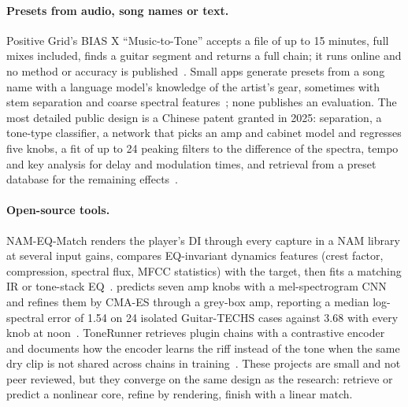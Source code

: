 \paragraph{Presets from audio, song names or text.} Positive Grid's BIAS X
``Music-to-Tone'' accepts a file of up to 15 minutes, full mixes included, finds a
guitar segment and returns a full chain; it runs online and no method or accuracy
is published~\cite{positivegridndbiasxhelp,positivegrid2025biasxai}. Small apps
generate presets from a song name with a language model's knowledge of the
artist's gear, sometimes with stem separation and coarse spectral
features~\cite{bouharb2026gptonebuilder,aitonetechndgenerator}; none publishes an
evaluation. The most detailed public design is a Chinese patent granted in 2025:
separation, a tone-type classifier, a network that picks an amp and cabinet model
and regresses five knobs, a fit of up to 24 peaking filters to the difference of
the spectra, tempo and key analysis for delay and modulation times, and retrieval
from a preset database for the remaining effects~\cite{huanyin2025presetpatent}.

\paragraph{Open-source tools.} NAM-EQ-Match renders the player's DI through every
capture in a NAM library at several input gains, compares EQ-invariant dynamics
features (crest factor, compression, spectral flux, MFCC statistics) with the
target, then fits a matching IR or tone-stack EQ~\cite{sd4562026nameqmatch}.
 predicts seven amp knobs with a mel-spectrogram CNN and refines
them by CMA-ES through a grey-box amp, reporting a median log-spectral error of
1.54\dB{} on 24 isolated Guitar-TECHS cases against 3.68\dB{} with every knob at
noon~\cite{neuwirth2026tonematch}. ToneRunner retrieves plugin chains with a
contrastive encoder and documents how the encoder learns the riff instead of the
tone when the same dry clip is not shared across chains in
training~\cite{nathanben2026tonerunner}. These projects are small and not peer
reviewed, but they converge on the same design as the research: retrieve or
predict a nonlinear core, refine by rendering, finish with a linear match.

